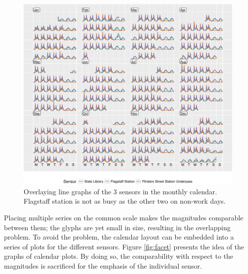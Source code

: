 \documentclass[article]{jss}
\begin{document}
\begin{CodeChunk}
\begin{figure}

{\centering \includegraphics[width=\textwidth]{figure/overlay-1} 

}

\caption[Overlaying line graphs of the 3 sensors in the monthly calendar]{Overlaying line graphs of the 3 sensors in the monthly calendar. Flagstaff station is not as busy as the other two on non-work days.}\label{fig:overlay}
\end{figure}
\end{CodeChunk}

Placing multiple series on the common scale makes the magnitudes
comparable between them; the glyphs are yet small in size, resulting in
the overlapping problem. To avoid the problem, the calendar layout can
be embedded into a series of plots for the different sensors. Figure
\ref{fig:facet} presents the idea of the graphs of calendar plots. By
doing so, the comparability with respect to the magnitudes is sacrificed
for the emphasis of the individual sensor.
\end{document}
